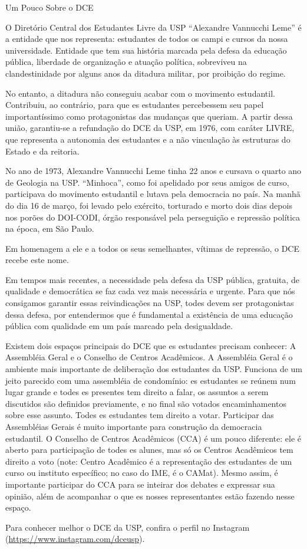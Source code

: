 \begin{secao}{Um Pouco Sobre o DCE}

O Diretório Central dos Estudantes Livre da USP ``Alexandre Vannucchi Leme'' é a
entidade que nos representa: estudantes de todos os campi e cursos da nossa universidade.
Entidade que tem sua história marcada pela defesa da educação pública, liberdade
de organização e atuação política, sobreviveu na clandestinidade por alguns anos
da ditadura militar, por proibição do regime.

No entanto, a ditadura não conseguiu acabar com o movimento estudantil. Contribuiu,
ao contrário, para que es estudantes percebessem seu papel importantíssimo como
protagonistas das mudanças que queriam. A partir dessa união, garantiu-se a
refundação do DCE da USP, em 1976, com caráter LIVRE, que representa a autonomia
des estudantes e a não vinculação às estruturas do Estado e da reitoria.

No ano de 1973, Alexandre Vannucchi Leme tinha 22 anos e cursava o quarto ano
de Geologia na USP. ``Minhoca'', como foi apelidado por seus amigos de curso, participava
do movimento estudantil e lutava pela democracia no país. Na manhã do dia 16 de março,
foi levado pelo exército, torturado e morto dois dias depois nos porões do DOI-CODI,
órgão responsável pela perseguição e repressão política na época, em São Paulo.

Em homenagem a ele e a todos os seus semelhantes, vítimas de repressão, o DCE recebe este nome.

Em tempos mais recentes, a necessidade pela defesa da USP pública, gratuita, de qualidade
e democrática se faz cada vez mais necessária e urgente. Para que nós consigamos
garantir essas reivindicações na USP, todes devem ser protagonistas dessa defesa,
por entendermos que é fundamental a existência de uma educação pública com qualidade
em um país marcado pela desigualdade.

Existem dois espaços principais do DCE que es estudantes precisam conhecer: A Assembléia 
Geral e o Conselho de Centros Acadêmicos.
A Assembléia Geral é o ambiente mais importante de deliberação dos estudantes da USP. Funciona de um
jeito parecido com uma assembléia de condomínio: es estudantes se reúnem num lugar grande e todes es
presentes tem direito a falar, os assuntos a serem discutidos são definidos previamente, e no final
são votados encaminhamentos sobre esse assunto. Todes es estudantes tem direito a votar. Participar das
Assembléias Gerais é muito importante para construção da democracia estudantil.
O Conselho de Centros Acadêmicos (CCA) é um pouco diferente: ele é aberto para participação de todes es alunes,
mas só os Centros Acadêmicos tem direito a voto (note: Centro Acadêmico é a representação des estudantes de
um curso ou instituto específico; no caso do IME, é o CAMat). Mesmo assim, é importante participar do CCA
para se inteirar dos debates e expressar sua opinião, além de acompanhar o que es nosses representantes 
estão fazendo nesse espaço. 

Para conhecer melhor o DCE da USP, confira o perfil no Instagram (\url{https://www.instagram.com/dceusp}).

\end{secao}
